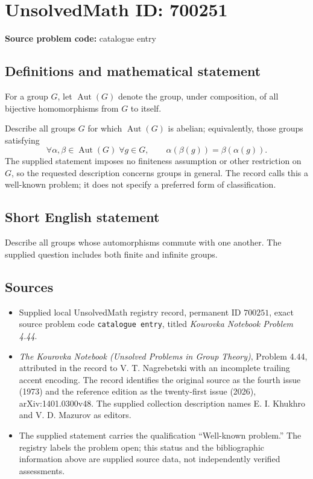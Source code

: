 \documentclass[11pt]{article}
\begin{document}
\section*{UnsolvedMath ID: 700251}
\textbf{Source problem code:} catalogue entry
\subsection{Definitions and mathematical statement}
For a group \(G\), let \(\operatorname{Aut}(G)\) denote the group, under composition, of all bijective homomorphisms from \(G\) to itself.

Describe all groups \(G\) for which \(\operatorname{Aut}(G)\) is abelian; equivalently, those groups satisfying
\[
\forall\alpha,\beta\in\operatorname{Aut}(G)\;\forall g\in G,\qquad
\alpha(\beta(g))=\beta(\alpha(g)).
\]
The supplied statement imposes no finiteness assumption or other restriction on \(G\), so the requested description concerns groups in general. The record calls this a well-known problem; it does not specify a preferred form of classification.
\subsection{Short English statement}
Describe all groups whose automorphisms commute with one another. The supplied question includes both finite and infinite groups.
\subsection{Sources}
\begin{itemize}
\item Supplied local UnsolvedMath registry record, permanent ID \(700251\), exact source problem code \texttt{catalogue entry}, titled \emph{Kourovka Notebook Problem 4.44}.
\item \emph{The Kourovka Notebook (Unsolved Problems in Group Theory)}, Problem 4.44, attributed in the record to V. T. Nagrebetski with an incomplete trailing accent encoding. The record identifies the original source as the fourth issue (1973) and the reference edition as the twenty-first issue (2026), arXiv:1401.0300v48. The supplied collection description names E. I. Khukhro and V. D. Mazurov as editors.
\item The supplied statement carries the qualification ``Well-known problem.'' The registry labels the problem open; this status and the bibliographic information above are supplied source data, not independently verified assessments.
\end{itemize}
\end{document}
